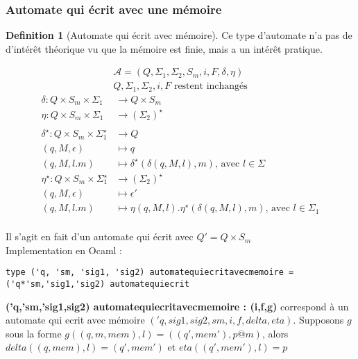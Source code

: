 \documentclass{article}
\theoremstyle{definition}
\newtheorem{definition}{Definition}[section]
\begin{document}
\subsubsection{Automate qui écrit avec une mémoire}

\begin{definition}[Automate qui écrit avec mémoire]
Ce type d'automate n'a pas de d'intérêt théorique vu que la mémoire est finie, mais a un intérêt pratique.

\begin{gather*}
    \mathcal{A} = (Q,\Sigma_1,\Sigma_2, S_m, i, F, \delta, \eta) \\
    Q,\Sigma_1,\Sigma_2,i,F \text{ restent inchangés}
\end{gather*}
\begin{align*}
    \delta : Q\times S_m \times \Sigma_1 &\rightarrow Q \times S_m \\
    \eta : Q\times S_m \times \Sigma_1&\rightarrow (\Sigma_2 )^\star\\
    \\             
    \delta^\star : Q\times S_m \times \Sigma_1^\star &\rightarrow Q \\
    (q,M,\epsilon) &\mapsto q\\
    (q,M,l.m) &\mapsto \delta^\star(\delta(q,M,l),m)\text{, avec }l\in \Sigma\\
    \eta^\star : Q\times S_m\times \Sigma_1^\star &\rightarrow (\Sigma_2)^\star \\
    (q,M,\epsilon) &\mapsto \epsilon '\\
    (q,M,l.m) &\mapsto \eta(q,M,l).\eta^\star(\delta(q,M,l),m) \text{, avec }l \in \Sigma_1\\
\end{align*}
\end{definition}
Il s'agit en fait d'un automate qui écrit avec $Q' = Q \times S_m$\\
Implementation en Ocaml : \\
\begin{lstlisting}    
type ('q, 'sm, 'sig1, 'sig2) automatequiecritavecmemoire = ('q*'sm,'sig1,'sig2) automatequiecrit
\end{lstlisting}
\textbf{('q,'sm,'sig1,sig2) automatequiecritavecmemoire : (i,f,g)} correspond \`a un automate
qui ecrit avec m\'emoire $('q,sig1,sig2,sm,i,f,delta,eta)$.
Supposons $g$ sous la forme $g((q,m,mem),l) = ((q',mem'),p@m)$,
alors $delta((q,mem),l) = (q',mem')$ et $eta((q',mem'),l) = p$\\\\
\end{document}
